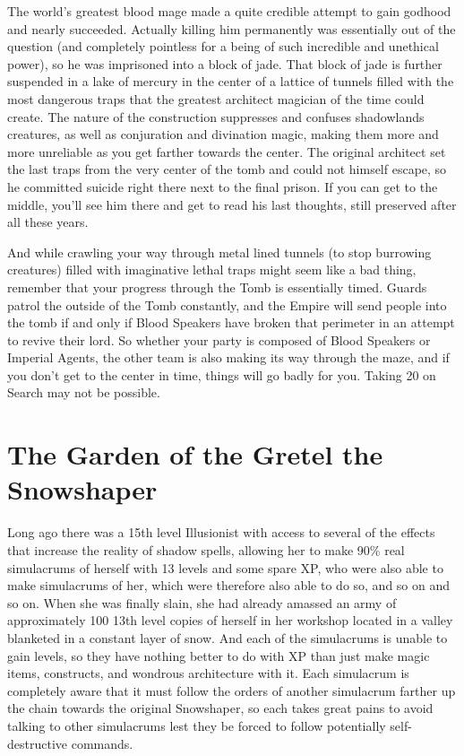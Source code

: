 The world's greatest blood mage made a quite credible attempt to gain godhood and nearly succeeded. Actually killing him permanently was essentially out of the question (and completely pointless for a being of such incredible and unethical power), so he was imprisoned into a block of jade. That block of jade is further suspended in a lake of mercury in the center of a lattice of tunnels filled with the most dangerous traps that the greatest architect magician of the time could create. The nature of the construction suppresses and confuses shadowlands creatures, as well as conjuration and divination magic, making them more and more unreliable as you get farther towards the center. The original architect set the last traps from the very center of the tomb and could not himself escape, so he committed suicide right there next to the final prison. If you can get to the middle, you'll see him there and get to read his last thoughts, still preserved after all these years.

And while crawling your way through metal lined tunnels (to stop burrowing creatures) filled with imaginative lethal traps might seem like a bad thing, remember that your progress through the Tomb is essentially timed. Guards patrol the outside of the Tomb constantly, and the Empire will send people into the tomb if and only if Blood Speakers have broken that perimeter in an attempt to revive their lord. So whether your party is composed of Blood Speakers or Imperial Agents, the other team is also making its way through the maze, and if you don't get to the center in time, things will go badly for you. Taking 20 on Search may not be possible.

\section{The Garden of the Gretel the Snowshaper}

Long ago there was a 15th level Illusionist with access to several of the effects that increase the reality of shadow spells, allowing her to make 90\% real simulacrums of herself with 13 levels and some spare XP, who were also able to make simulacrums of her, which were therefore also able to do so, and so on and so on. When she was finally slain, she had already amassed an army of approximately 100 13th level copies of herself in her workshop located in a valley blanketed in a constant layer of snow. And each of the simulacrums is unable to gain levels, so they have nothing better to do with XP than just make magic items, constructs, and wondrous architecture with it. Each simulacrum is completely aware that it must follow the orders of another simulacrum farther up the chain towards the original Snowshaper, so each takes great pains to avoid talking to other simulacrums lest they be forced to follow potentially self-destructive commands.


